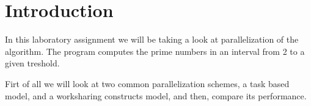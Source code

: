 \section{Introduction}
\justify
In this laboratory assignment we will be taking a look at \omp parallelization of the \sieve algorithm.
The program computes the prime numbers in an interval from 2 to a given treshold. 

\justify
Firt of all we will look at two common \omp parallelization schemes, a task based model, and a worksharing constructs model, and then, compare its performance.


